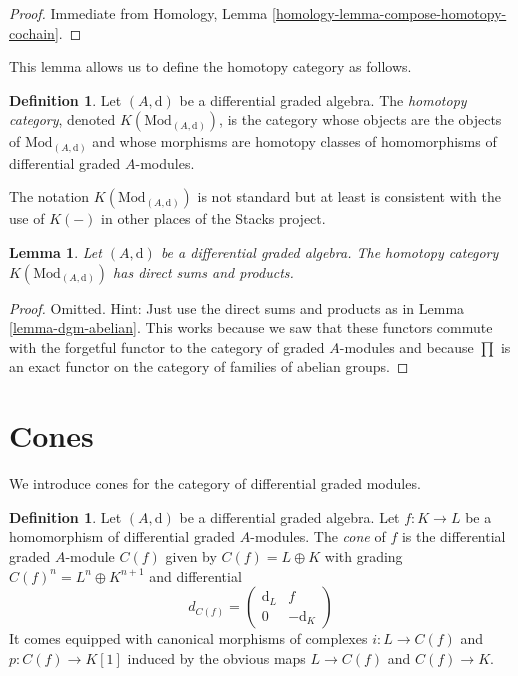 \documentclass{stacks-project}
\theoremstyle{plain}
\newtheorem{lemma}[subsection]{Lemma}
\theoremstyle{definition}
\newtheorem{definition}[subsection]{Definition}
\theoremstyle{remark}
\numberwithin{equation}{subsection}
\begin{document}
\begin{proof}
Immediate from Homology, Lemma \ref{homology-lemma-compose-homotopy-cochain}.
\end{proof}

\noindent
This lemma allows us to define the homotopy category as follows.

\begin{definition}
\label{definition-complexes-notation}
Let $(A, \text{d})$ be a differential graded algebra.
The {\it homotopy category}, denoted $K(\text{Mod}_{(A, \text{d})})$, is
the category whose objects are the objects of
$\text{Mod}_{(A, \text{d})}$ and whose morphisms are homotopy classes
of homomorphisms of differential graded $A$-modules.
\end{definition}

\noindent
The notation $K(\text{Mod}_{(A, \text{d})})$ is not standard but at least is
consistent with the use of $K(-)$ in other places of the Stacks project.

\begin{lemma}
\label{lemma-homotopy-direct-sums}
Let $(A, \text{d})$ be a differential graded algebra.
The homotopy category $K(\text{Mod}_{(A, \text{d})})$
has direct sums and products.
\end{lemma}

\begin{proof}
Omitted. Hint: Just use the direct sums and products as in
Lemma \ref{lemma-dgm-abelian}. This works because we saw that
these functors commute with the forgetful functor to the category
of graded $A$-modules and because $\prod$ is an exact functor
on the category of families of abelian groups.
\end{proof}







\section{Cones}
\label{section-cones}

\noindent
We introduce cones for the category of differential graded modules.

\begin{definition}
\label{definition-cone}
Let $(A, \text{d})$ be a differential graded algebra.
Let $f : K \to L$ be a homomorphism of differential graded $A$-modules.
The {\it cone} of $f$ is the differential graded $A$-module
$C(f)$ given by $C(f) = L \oplus K$ with grading
$C(f)^n = L^n \oplus K^{n + 1}$ and
differential
$$
d_{C(f)} =
\left(
\begin{matrix}
\text{d}_L & f \\
0 & -\text{d}_K
\end{matrix}
\right)
$$
It comes equipped with canonical morphisms of complexes $i : L \to C(f)$
and $p : C(f) \to K[1]$ induced by the obvious maps $L \to C(f)$
and $C(f) \to K$.
\end{definition}
\end{document}
